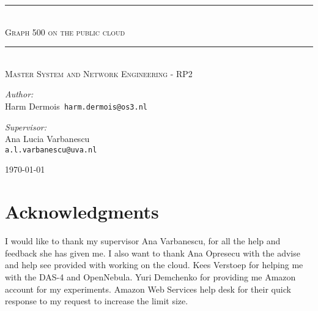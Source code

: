 \documentclass[A4]{scrartcl}
\newcommand{\HRule}{\rule{\linewidth}{0.5mm}}
\begin{document}
\begin{titlepage}
	\begin{center}
		
		\HRule \\[0.5cm]
		\textsc{\LARGE Graph 500 on the public cloud}\\[0.5cm]
		\HRule \\[0.3cm]
		
		\textsc{\large{Master System and Network Engineering - RP2}}\\[0.5cm]
		
		\vfill
		
		\begin{minipage}[t]{0.4\textwidth}
			\begin{flushleft} \large 
				\emph{Author:}\\
				Harm Dermois\texttt{ harm.dermois@os3.nl}
			\end{flushleft}
		\end{minipage}%
		\begin{minipage}[t]{0.4\textwidth}
			\begin{flushleft} \large
				\emph{Supervisor:} \\
				Ana Lucia Varbanescu \\
				\texttt{a.l.varbanescu@uva.nl}\\				
			\end{flushleft}
		\end{minipage}
		
	\end{center}
	
	\vspace{2cm}

		
		
		\vfill
		
		{\large \today}
		
\end{titlepage}


\newpage



\newpage

\section*{Acknowledgments}
I would like to thank my supervisor Ana Varbanescu, for all the help and feedback she has given me. I also want to thank Ana Opresecu with the advise and help see provided with working on the cloud. Kees Verstoep for helping me with the DAS-4 and OpenNebula. Yuri Demchenko for providing me Amazon account for my experiments. Amazon Web Services help desk for their quick response to my request to increase the limit size.
\end{document}
